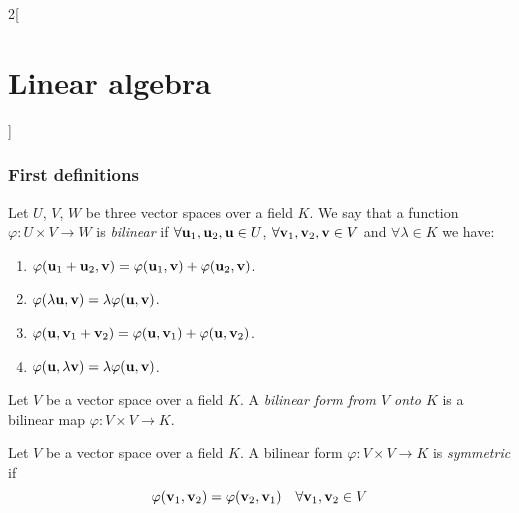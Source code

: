 \documentclass[../../../main.tex]{subfiles}
\begin{document}
\begin{multicols}{2}[\section{Linear algebra}]
    \subsubsection*{First definitions}
    \begin{definition}
        Let $U$, $V$, $W$ be three vector spaces over a field $K$. We say that a function $\varphi:U\times V\rightarrow W$ is \textit{bilinear} if $\forall\boldsymbol{\mathrm{u}}_1,\boldsymbol{\mathrm{u}}_2,\boldsymbol{\mathrm{u}}\in U$, $\forall \boldsymbol{\mathrm{v}}_1,\boldsymbol{\mathrm{v}}_2,\boldsymbol{\mathrm{v}}\in V$ and $\forall\lambda\in K$ we have:
        \begin{enumerate}
            \item $\varphi(\boldsymbol{\mathrm{u}}_1+\boldsymbol{\mathrm{u}}_2,\boldsymbol{\mathrm{v}})=\varphi(\boldsymbol{\mathrm{u}}_1,\boldsymbol{\mathrm{v}})+\varphi(\boldsymbol{\mathrm{u}}_2,\boldsymbol{\mathrm{v}})$.
            \item $\varphi(\lambda \boldsymbol{\mathrm{u}},\boldsymbol{\mathrm{v}})=\lambda \varphi(\boldsymbol{\mathrm{u}},\boldsymbol{\mathrm{v}})$.
            \item $\varphi(\boldsymbol{\mathrm{u}},\boldsymbol{\mathrm{v}}_1+\boldsymbol{\mathrm{v}}_2)=\varphi(\boldsymbol{\mathrm{u}},\boldsymbol{\mathrm{v}}_1)+\varphi(\boldsymbol{\mathrm{u}},\boldsymbol{\mathrm{v}}_2)$.
            \item $\varphi(\boldsymbol{\mathrm{u}},\lambda \boldsymbol{\mathrm{v}})=\lambda \varphi(\boldsymbol{\mathrm{u}},\boldsymbol{\mathrm{v}})$.
        \end{enumerate}
    \end{definition}
    \begin{definition}
        Let $V$ be a vector space over a field $K$. A \textit{bilinear form from $V$ onto $K$} is a bilinear map $\varphi:V\times V\rightarrow K$.
    \end{definition}
    \begin{definition}
        Let $V$ be a vector space over a field $K$. A bilinear form $\varphi:V\times V\rightarrow K$ is \textit{symmetric} if $$\varphi(\boldsymbol{\mathrm{v}}_1,\boldsymbol{\mathrm{v}}_2)=\varphi(\boldsymbol{\mathrm{v}}_2,\boldsymbol{\mathrm{v}}_1)\quad\forall \boldsymbol{\mathrm{v}}_1,\boldsymbol{\mathrm{v}}_2\in V$$
    \end{definition}

\end{multicols}
\end{document}
